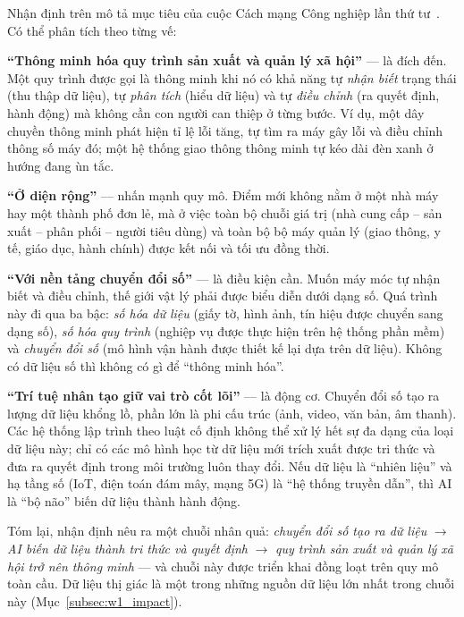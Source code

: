 Nhận định trên mô tả mục tiêu của cuộc Cách mạng Công nghiệp lần thứ tư~\citep{schwab2016fourth}. Có thể phân tích theo từng vế:

\textbf{``Thông minh hóa quy trình sản xuất và quản lý xã hội''} — là đích đến. Một quy trình được gọi là thông minh khi nó có khả năng tự \emph{nhận biết} trạng thái (thu thập dữ liệu), tự \emph{phân tích} (hiểu dữ liệu) và tự \emph{điều chỉnh} (ra quyết định, hành động) mà không cần con người can thiệp ở từng bước. Ví dụ, một dây chuyền thông minh phát hiện tỉ lệ lỗi tăng, tự tìm ra máy gây lỗi và điều chỉnh thông số máy đó; một hệ thống giao thông thông minh tự kéo dài đèn xanh ở hướng đang ùn tắc.

\textbf{``Ở diện rộng''} — nhấn mạnh quy mô. Điểm mới không nằm ở một nhà máy hay một thành phố đơn lẻ, mà ở việc toàn bộ chuỗi giá trị (nhà cung cấp -- sản xuất -- phân phối -- người tiêu dùng) và toàn bộ bộ máy quản lý (giao thông, y tế, giáo dục, hành chính) được kết nối và tối ưu đồng thời.

\textbf{``Với nền tảng chuyển đổi số''} — là điều kiện cần. Muốn máy móc tự nhận biết và điều chỉnh, thế giới vật lý phải được biểu diễn dưới dạng số. Quá trình này đi qua ba bậc: \emph{số hóa dữ liệu} (giấy tờ, hình ảnh, tín hiệu được chuyển sang dạng số), \emph{số hóa quy trình} (nghiệp vụ được thực hiện trên hệ thống phần mềm) và \emph{chuyển đổi số} (mô hình vận hành được thiết kế lại dựa trên dữ liệu). Không có dữ liệu số thì không có gì để ``thông minh hóa''.

\textbf{``Trí tuệ nhân tạo giữ vai trò cốt lõi''} — là động cơ. Chuyển đổi số tạo ra lượng dữ liệu khổng lồ, phần lớn là phi cấu trúc (ảnh, video, văn bản, âm thanh). Các hệ thống lập trình theo luật cố định không thể xử lý hết sự đa dạng của loại dữ liệu này; chỉ có các mô hình học từ dữ liệu mới trích xuất được tri thức và đưa ra quyết định trong môi trường luôn thay đổi. Nếu dữ liệu là ``nhiên liệu'' và hạ tầng số (IoT, điện toán đám mây, mạng 5G) là ``hệ thống truyền dẫn'', thì AI là ``bộ não'' biến dữ liệu thành hành động.

Tóm lại, nhận định nêu ra một chuỗi nhân quả: \emph{chuyển đổi số tạo ra dữ liệu} $\rightarrow$ \emph{AI biến dữ liệu thành tri thức và quyết định} $\rightarrow$ \emph{quy trình sản xuất và quản lý xã hội trở nên thông minh} — và chuỗi này được triển khai đồng loạt trên quy mô toàn cầu. Dữ liệu thị giác là một trong những nguồn dữ liệu lớn nhất trong chuỗi này (Mục~\ref{subsec:w1_impact}).

